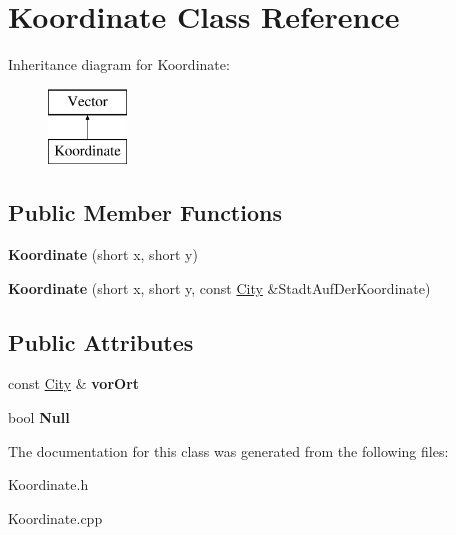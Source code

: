 \hypertarget{class_koordinate}{\section{Koordinate Class Reference}
\label{class_koordinate}
}
Inheritance diagram for Koordinate\-:\begin{figure}[H]
\begin{center}
\leavevmode
\includegraphics[height=2.000000cm]{class_koordinate}
\end{center}
\end{figure}
\subsection*{Public Member Functions}
\begin{DoxyCompactItemize}
\item 
\hypertarget{class_koordinate_a1ed43c738d011d36f9191bcea0addc83}{{\bfseries Koordinate} (short x, short y)}\label{class_koordinate_a1ed43c738d011d36f9191bcea0addc83}

\item 
\hypertarget{class_koordinate_a314da8c3fd7d18277105da8ecf662e90}{{\bfseries Koordinate} (short x, short y, const \hyperlink{class_city}{City} \&Stadt\-Auf\-Der\-Koordinate)}\label{class_koordinate_a314da8c3fd7d18277105da8ecf662e90}

\end{DoxyCompactItemize}
\subsection*{Public Attributes}
\begin{DoxyCompactItemize}
\item 
\hypertarget{class_koordinate_a99a5126e3a5d6e52afc4607e608dfaa4}{const \hyperlink{class_city}{City} \& {\bfseries vor\-Ort}}\label{class_koordinate_a99a5126e3a5d6e52afc4607e608dfaa4}

\item 
\hypertarget{class_koordinate_a00d8b1782a2f2cdcfbbdc14e14059ed9}{bool {\bfseries Null}}\label{class_koordinate_a00d8b1782a2f2cdcfbbdc14e14059ed9}

\end{DoxyCompactItemize}


The documentation for this class was generated from the following files\-:\begin{DoxyCompactItemize}
\item 
Koordinate.\-h\item 
Koordinate.\-cpp\end{DoxyCompactItemize}
